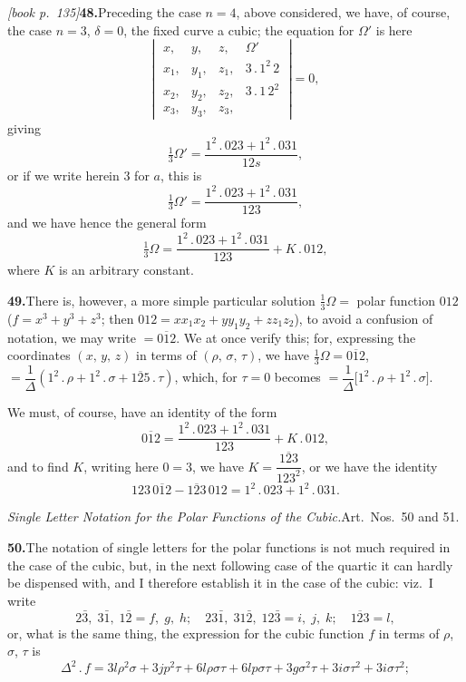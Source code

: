 \documentclass[11pt,a4paper]{article}
\theoremstyle{plain}
\theoremstyle{definition}
\theoremstyle{remark}
\providecommand{\bdet}[1]{\overline{#1}}
\begin{document}
\medskip\noindent\textit{[book p.~135]}\quad \textbf{48.}\quad Preceding the case $n = 4$, above considered, we have, of course, the case $n = 3$, $\delta = 0$, the fixed curve a cubic; the equation for $\Omega'$ is here
\[
\left|\;\begin{array}{cccc}
x, & y, & z, & \Omega'\\
x_1, & y_1, & z_1, & 3\,.\,1^{2}\,2\\
x_2, & y_2, & z_2, & 3\,.\,1\,2^{2}\\
x_3, & y_3, & z_3,
\end{array}\;\right| = 0,
\]
giving
\[
\tfrac{1}{3}\Omega' = \frac{1^{2}\,.\,023 + 1^{2}\,.\,031}{12s},
\]
or if we write herein $3$ for $a$, this is
\[
\tfrac{1}{3}\Omega' = \frac{1^{2}\,.\,023 + 1^{2}\,.\,031}{123},
\]
and we have hence the general form
\[
\tfrac{1}{3}\Omega = \frac{1^{2}\,.\,023 + 1^{2}\,.\,031}{123} + K\,.\,012,
\]
where $K$ is an arbitrary constant.

\medskip\noindent\textbf{49.}\quad There is, however, a more simple particular solution $\tfrac{1}{3}\Omega = $ polar function $012$ ($f = x^3 + y^3 + z^3$; then $012 = xx_1x_2 + yy_1y_2 + zz_1z_2$), to avoid a confusion of notation, we may write $= \bdet{012}$. We at once verify this; for, expressing the coordinates $(x,\,y,\,z)$ in terms of $(\rho,\,\sigma,\,\tau)$, we have $\tfrac{1}{3}\Omega = \bdet{012}$, $= \dfrac{1}{\Delta}(1^2\,.\,\rho + 1^2\,.\,\sigma + \bdet{125}\,.\,\tau)$, which, for $\tau = 0$ becomes $= \dfrac{1}{\Delta}\bigl[1^{2}\,.\,\rho + 1^{2}\,.\,\sigma\bigr]$.

We must, of course, have an identity of the form
\[
\bdet{012} = \frac{1^{2}\,.\,023 + 1^{2}\,.\,031}{123} + K\,.\,012,
\]
and to find $K$, writing here $0 = 3$, we have $K = \dfrac{\bdet{123}}{123^2}$, or we have the identity
\[
123\,\bdet{012} - \bdet{123}\,012 = 1^{2}\,.\,023 + 1^{2}\,.\,031.
\]

\medskip\noindent\textit{Single Letter Notation for the Polar Functions of the Cubic.}\quad Art.\ Nos.\ 50 and 51.

\medskip\noindent\textbf{50.}\quad The notation of single letters for the polar functions is not much required in the case of the cubic, but, in the next following case of the quartic it can hardly be dispensed with, and I therefore establish it in the case of the cubic: viz.\ I write
\[
2\bar{3},\;3\bar{1},\;1\bar{2} = f,\;g,\;h;\quad 23\bar{1},\;31\bar{2},\;12\bar{3} = i,\;j,\;k;\quad \bdet{123} = l,
\]
or, what is the same thing, the expression for the cubic function $f$ in terms of $\rho$, $\sigma$, $\tau$ is
\[
\Delta^2\,.\,f = 3l\rho^2\sigma + 3jp^2\tau + 6l\rho\sigma\tau + 6lp\sigma\tau + 3g\sigma^2\tau + 3i\sigma\tau^2 + 3i\sigma\tau^2;
\]
\end{document}
